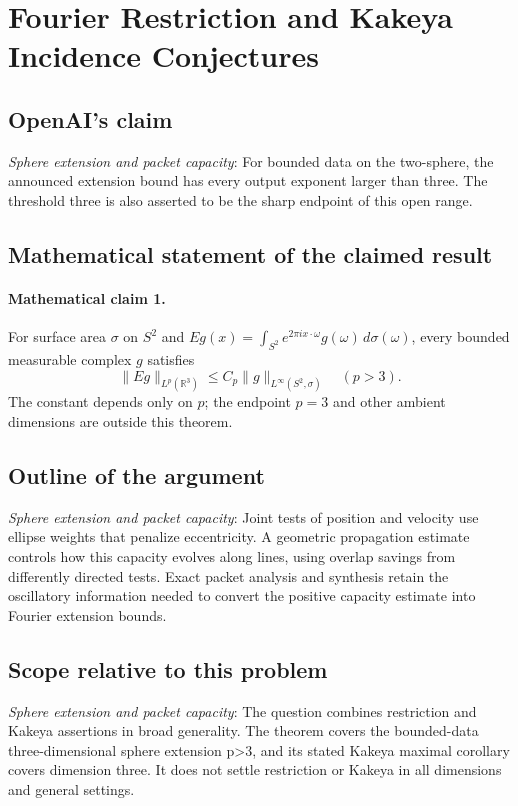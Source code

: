 \documentclass[11pt]{article}
\begin{document}
\section*{Fourier Restriction and Kakeya Incidence Conjectures}

\subsection{OpenAI's claim}
\textit{Sphere extension and packet capacity}: For bounded data on the two-sphere, the announced extension bound has every output exponent larger than three. The threshold three is also asserted to be the sharp endpoint of this open range.

\subsection{Mathematical statement of the claimed result}
\paragraph{Mathematical claim 1.} For surface area $\sigma$ on $S^2$ and $Eg(x)=\int_{S^2}e^{2\pi ix\cdot\omega}g(\omega)\,d\sigma(\omega)$, every bounded measurable complex $g$ satisfies \[\|Eg\|_{L^p(\mathbb R^3)}\le C_p\|g\|_{L^\infty(S^2,\sigma)}\quad(p>3).\] The constant depends only on $p$; the endpoint $p=3$ and other ambient dimensions are outside this theorem.

\subsection{Outline of the argument}
\textit{Sphere extension and packet capacity}: Joint tests of position and velocity use ellipse weights that penalize eccentricity. A geometric propagation estimate controls how this capacity evolves along lines, using overlap savings from differently directed tests. Exact packet analysis and synthesis retain the oscillatory information needed to convert the positive capacity estimate into Fourier extension bounds.

\subsection{Scope relative to this problem}
\textit{Sphere extension and packet capacity}: The question combines restriction and Kakeya assertions in broad generality. The theorem covers the bounded-data three-dimensional sphere extension p>3, and its stated Kakeya maximal corollary covers dimension three. It does not settle restriction or Kakeya in all dimensions and general settings.
\end{document}

